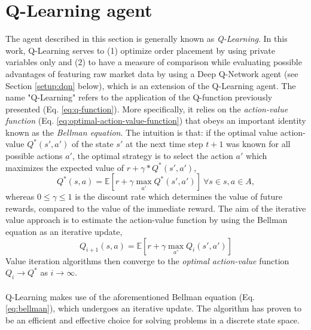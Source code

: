 \section{Q-Learning agent}
\label{setup:q-learning}
The agent described in this section is generally known as \textit{Q-Learning}\cite{watkins1992q}.
In this work, Q-Learning serves to (1) optimize order placement by using private variables only and (2) to have a measure of comparison while evaluating possible advantages of featuring raw market data by using a Deep Q-Network agent (see Section \ref{setup:dqn} below), which is an extension of the Q-Learning agent.
The name "Q-Learning" refers to the application of the Q-function previously presented (Eq. \ref{eq:q-function}).
More specifically, it relies on the \textit{action-value function} (Eq. \ref{eq:optimal-action-value-function}) that obeys an important identity known as the \textit{Bellman equation}.
The intuition is that: if the optimal value action-value $Q^*(s',a')$ of the state $s'$ at the next time step $t+1$ was known for all possible actions $a'$, the optimal strategy is to select the action $a'$ which maximizes the expected value of $r+\gamma*Q^*(s',a')$,
\begin{equation}\label{eq:bellman}
Q^*(s,a)=\mathbb{E}[r+\gamma \max_{a'} Q^*(s',a')] \ \forall{s}\in{s},  a\in{A},
\end{equation}
whereas $0 \le \gamma \le 1$ is the discount rate which determines the value of future rewards, compared to the value of the immediate reward.
The aim of the iterative value approach is to estimate the action-value function by using the Bellman equation as an iterative update,
\begin{equation}
Q_{i+1}(s,a)=\mathbb{E}[r+\gamma \max_{a'}Q_{i}(s',a')]
\end{equation}
Value iteration algorithms then converge to the \textit{optimal action-value} function $Q_{i} \rightarrow Q^*$ as $i \rightarrow \infty$. \cite{sutton1998reinforcement}
\\
\\
Q-Learning makes use of the aforementioned Bellman equation (Eq. \ref{eq:bellman}), which undergoes an iterative update.
The algorithm has proven to be an efficient and effective choice for solving problems in a discrete state space.

